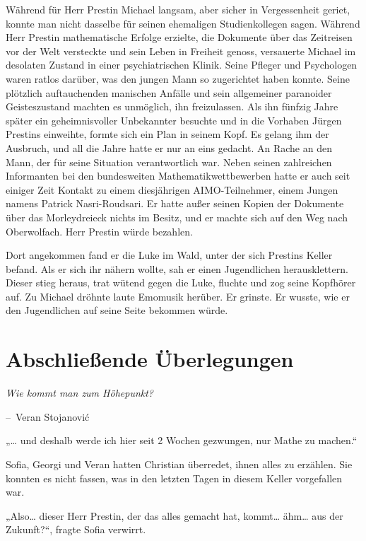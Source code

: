 \documentclass[oneside]{memoir}
\makeatletter
\newenvironment{chapquote}[2][2em]
  {\setlength{\@tempdima}{#1}%
   \def\chapquote@author{#2}%
   \parshape 1 \@tempdima \dimexpr\textwidth-2\@tempdima\relax%
   \itshape}
  {\par\normalfont\hfill--\ \chapquote@author\hspace*{\@tempdima}\par\bigskip}
\makeatother
\begin{document}
Während für Herr Prestin Michael langsam, aber sicher in Vergessenheit geriet, konnte man nicht dasselbe für seinen ehemaligen Studienkollegen sagen. Während Herr Prestin mathematische Erfolge erzielte, die Dokumente über das Zeitreisen vor der Welt versteckte und sein Leben in Freiheit genoss, versauerte Michael im desolaten Zustand in einer psychiatrischen Klinik. Seine Pfleger und Psychologen waren ratlos darüber, was den jungen Mann so zugerichtet haben konnte. Seine plötzlich auftauchenden manischen Anfälle und sein allgemeiner paranoider Geisteszustand machten es unmöglich, ihn freizulassen. Als ihn fünfzig Jahre später ein geheimnisvoller Unbekannter besuchte und in die Vorhaben Jürgen Prestins einweihte, formte sich ein Plan in seinem Kopf. Es gelang ihm der Ausbruch, und all die Jahre hatte er nur an eins gedacht. An Rache an den Mann, der für seine Situation verantwortlich war. Neben seinen zahlreichen Informanten bei den bundesweiten Mathematikwettbewerben hatte er auch seit einiger Zeit Kontakt zu einem diesjährigen AIMO-Teilnehmer, einem Jungen namens Patrick Nasri-Roudsari. Er hatte außer seinen Kopien der Dokumente über das Morleydreieck nichts im Besitz, und er machte sich auf den Weg nach Oberwolfach. Herr Prestin würde bezahlen.

Dort angekommen fand er die Luke im Wald, unter der sich Prestins Keller befand. Als er sich ihr nähern wollte, sah er einen Jugendlichen herausklettern. Dieser stieg heraus, trat wütend gegen die Luke, fluchte und zog seine Kopfhörer auf. Zu Michael dröhnte laute Emomusik herüber. Er grinste. Er wusste, wie er den Jugendlichen auf seine Seite bekommen würde.

\chapter{Abschließende Überlegungen} %
\begin{chapquote}{Veran Stojanović}
\glqq Wie kommt man zum Höhepunkt?\grqq
\end{chapquote}

„\ldots{} und deshalb werde ich hier seit 2 Wochen gezwungen, nur Mathe zu machen.“

Sofia, Georgi und Veran hatten Christian überredet, ihnen alles zu erzählen. Sie konnten es nicht fassen, was in den letzten Tagen in diesem Keller vorgefallen war.

„Also\ldots{} dieser Herr Prestin, der das alles gemacht hat, kommt\ldots{} ähm\ldots{} aus der Zukunft?“, fragte Sofia verwirrt.
\end{document}
